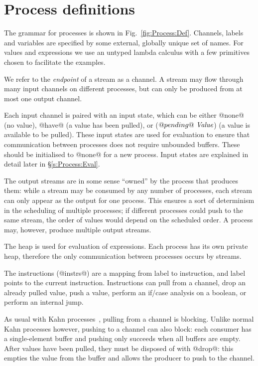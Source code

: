 
\clearpage{}
\section{Process definitions}



The grammar for processes is shown in Fig.~\ref{fig:Process:Def}.
Channels, labels and variables are specified by some external, globally unique set of names.
For values and expressions we use an untyped lambda calculus with a few primitives chosen to facilitate the examples.

We refer to the \emph{endpoint} of a stream as a channel.
A stream may flow through many input channels on different processes, but can only be produced from at most one output channel.

Each input channel is paired with an input state, which can be either @none@ (no value), @have@ (a value has been pulled), or ($@pending@~\textit{Value}$) (a value is available to be pulled).
These input states are used for evaluation to ensure that communication between processes does not require unbounded buffers.
These should be initialised to @none@ for a new process.
Input states are explained in detail later in \S\ref{s:Process:Eval}.

The output streams are in some sense ``owned'' by the process that produces them: while a stream may be consumed by any number of processes, each stream can only appear as the output for one process.
This ensures a sort of determinism in the scheduling of multiple processes; if different processes could push to the same stream, the order of values would depend on the scheduled order.
A process may, however, produce multiple output streams.

The heap is used for evaluation of expressions.
Each process has its own private heap, therefore the only communication between processes occurs by streams.

The instructions (@instrs@) are a mapping from label to instruction, and label points to the current instruction.
Instructions can pull from a channel, drop an already pulled value, push a value, perform an if/case analysis on a boolean, or perform an internal jump.

As usual with Kahn processes~\cite{kahn1976coroutines}, pulling from a channel is blocking.
Unlike normal Kahn processes however, pushing to a channel can also block: each consumer has a single-element buffer and pushing only succeeds when all buffers are empty.
After values have been pulled, they must be disposed of with @drop@: this empties the value from the buffer and allows the producer to push to the channel.

